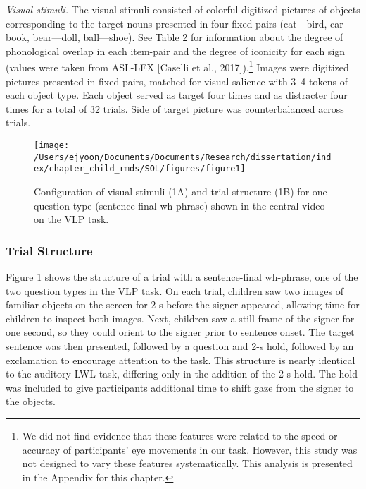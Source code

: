 \documentclass[oneside]{report}
\begin{document}
\emph{Visual stimuli.} The visual stimuli consisted of colorful
digitized pictures of objects corresponding to the target nouns
presented in four fixed pairs (cat---bird, car---book, bear---doll,
ball---shoe). See Table 2 for information about the degree of
phonological overlap in each item-pair and the degree of iconicity for
each sign (values were taken from ASL-LEX {[}Caselli et al.,
2017{]}).\footnote{We did not find evidence that these features were
  related to the speed or accuracy of participants' eye movements in our
  task. However, this study was not designed to vary these features
  systematically. This analysis is presented in the Appendix for this
  chapter.} Images were digitized pictures presented in fixed pairs,
matched for visual salience with 3--4 tokens of each object type. Each
object served as target four times and as distracter four times for a
total of 32 trials. Side of target picture was counterbalanced across
trials.
\begin{figure}[!t]

{\centering \texttt{[image: /Users/ejyoon/Documents/Documents/Research/dissertation/index/chapter\_child\_rmds/SOL/figures/figure1]} 

}

\caption[Stimuli in the Visual Language Processing Task used in Experiment 1.1]{Configuration of visual stimuli (1A) and trial structure (1B) for one question type (sentence final wh-phrase) shown in the central video on the VLP task.}\label{fig:sol-trial-fig}
\end{figure}
\subsubsection{Trial Structure}\label{trial-structure}

Figure 1 shows the structure of a trial with a sentence-final wh-phrase,
one of the two question types in the VLP task. On each trial, children
saw two images of familiar objects on the screen for 2 s before the
signer appeared, allowing time for children to inspect both images.
Next, children saw a still frame of the signer for one second, so they
could orient to the signer prior to sentence onset. The target sentence
was then presented, followed by a question and 2-s hold, followed by an
exclamation to encourage attention to the task. This structure is nearly
identical to the auditory LWL task, differing only in the addition of
the 2-s hold. The hold was included to give participants additional time
to shift gaze from the signer to the objects.
\end{document}
